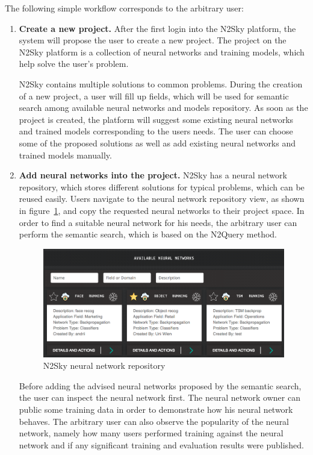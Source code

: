 \documentclass[conference]{IEEEtran}
\begin{document}
The following simple workflow corresponds to the arbitrary user:
\begin{enumerate}
\item \textbf{Create a new project.} After the first login into the N2Sky platform, the system will propose the user to create a new project. The project on the N2Sky platform is a collection of neural networks and training models, which help solve the user's problem. 

N2Sky contains multiple solutions to common problems. During the creation of a new project, a user will fill up fields, which will be used for semantic search among available neural networks and models repository.  As soon as the project is created, the platform will suggest some existing neural networks and trained models corresponding to the users needs. The user can choose some of the proposed solutions as well as add existing neural networks and trained models manually. 
\item \textbf{Add neural networks into the project.} N2Sky has a neural network repository, which stores different solutions for typical problems, which can be reused easily. Users navigate to the neural network repository view, as shown in figure~\ref{fig:repo}, and copy the requested neural networks to their project space. In order to find a suitable neural network for his needs, the arbitrary user can perform the semantic search, which is based on the N2Query method. 

\begin{figure}
  \includegraphics[width=\linewidth]{repo.png}
  \caption{N2Sky neural network repository}
  \label{fig:repo}
\end{figure}

Before adding the advised neural networks proposed by the semantic search, the user can inspect the neural network first. The neural network owner can public some training data in order to demonstrate how his neural network behaves. The arbitrary user can also observe the popularity of the neural network, namely how many users performed training against the neural network and if any significant training and evaluation results were published.  


\end{enumerate}
\end{document}
